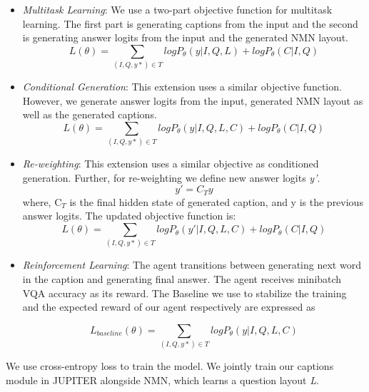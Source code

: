\begin{itemize}
\item \textit{Multitask Learning}: We use a two-part objective function for multitask learning. The first part is generating  captions from the input and the second is generating answer logits from the input and the generated NMN layout. \\
\begin{equation}
    L(\theta) = \sum_{(I, Q, y*) \in T} logP_\theta(y | I, Q, L) + logP_\theta(C | I, Q)
\end{equation}
 
\item \textit{Conditional Generation}: This extension uses a similar objective function. However, we generate answer logits from the input, generated NMN layout as well as the generated captions.
\begin{equation}
    L(\theta) = \sum_{(I, Q, y*) \in T} logP_\theta(y | I, Q, L, C) + logP_\theta(C | I, Q)
\end{equation}

\item \textit{Re-weighting}: This extension uses a similar objective as conditioned generation. Further, for re-weighting we define new answer logits \textit{y'}. 
\begin{equation}
    y' = C_{T}  y
\end{equation}
where, C$_{T}$ is the final hidden state of generated caption, and y is the previous answer logits. The updated objective function is: 
\begin{equation}
    L(\theta) = \sum_{(I, Q, y*) \in T} logP_\theta(y' | I, Q, L, C) + logP_\theta(C | I, Q)
\end{equation}

\item \textit{Reinforcement Learning}: The agent transitions between generating next word in the caption and generating final answer. The agent receives minibatch VQA accuracy as its reward. The Baseline we use to stabilize the training and  the expected reward of our agent respectively are expressed as 

\begin{equation}
    L_{baseline}(\theta) = \sum_{(I, Q, y*) \in T} logP_\theta(y | I, Q, L, C) 
\end{equation}



\iffalse
\begin{equation}
   Reward = \sum_{n=0}^{N} ( r_n) 
\end{equation}

where N is the length of captions.
\fi

\end{itemize}
We use cross-entropy loss to train the model. We jointly train our captions module in JUPITER alongside NMN, which learns a question layout \textit{L}. 

